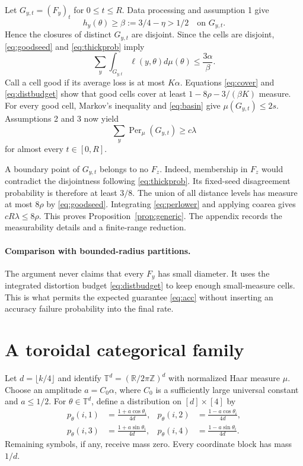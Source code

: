 \documentclass[twoside]{article}
\theoremstyle{definition}
\newcommand{\R}{\mathbb R}
\newcommand{\T}{\mathbb T}
\newcommand{\1}{\mathbf 1}
\newcommand{\Per}{\operatorname{Per}}
\begin{document}
Let $G_{y,t}=(F_y)_t$ for $0\le t\le R$. Data processing and assumption 1 give
\begin{equation}
 h_y(\theta)\ge \beta:=3/4-\eta>1/2
 \quad\text{on }G_{y,t}.
 \label{eq:thickprob}
\end{equation}
Hence the closures of distinct $G_{y,t}$ are disjoint. Since the cells are disjoint, \eqref{eq:goodseed} and \eqref{eq:thickprob} imply
\begin{equation}
 \sum_y\int_{G_{y,t}}\ell(y,\theta)d\mu(\theta)
 \le \frac{3\alpha}{\beta}.
 \label{eq:distbudget}
\end{equation}
Call a cell good if its average loss is at most $K\alpha$. Equations \eqref{eq:cover} and \eqref{eq:distbudget} show that good cells cover at least $1-8\rho-3/(\beta K)$ measure. For every good cell, Markov's inequality and \eqref{eq:basin} give $\mu(G_{y,t})\le2s$. Assumptions 2 and 3 now yield
\begin{equation}
 \sum_y\Per_\mu(G_{y,t})\ge c\lambda
 \label{eq:perlower}
\end{equation}
for almost every $t\in[0,R]$.

A boundary point of $G_{y,t}$ belongs to no $F_z$. Indeed, membership in $F_z$ would contradict the disjointness following \eqref{eq:thickprob}. Its fixed-seed disagreement probability is therefore at least $3/8$. The union of all distance levels has measure at most $8\rho$ by \eqref{eq:goodseed}. Integrating \eqref{eq:perlower} and applying coarea gives $cR\lambda\le8\rho$. This proves Proposition~\ref{prop:generic}. The appendix records the measurability details and a finite-range reduction.

\paragraph{Comparison with bounded-radius partitions.}
The argument never claims that every $F_y$ has small diameter. It uses the integrated distortion budget \eqref{eq:distbudget} to keep enough small-measure cells. This is what permits the expected guarantee \eqref{eq:acc} without inserting an accuracy failure probability into the final rate.

\section{A toroidal categorical family}

Let $d=\lfloor k/4\rfloor$ and identify $\T^d=(\R/2\pi\mathbb Z)^d$ with normalized Haar measure $\mu$. Choose an amplitude $a=C_0\alpha$, where $C_0$ is a sufficiently large universal constant and $a\le1/2$. For $\theta\in\T^d$, define a distribution on $[d]\times[4]$ by
\begin{align}
 p_\theta(i,1)&=\frac{1+a\cos\theta_i}{4d}, &
 p_\theta(i,2)&=\frac{1-a\cos\theta_i}{4d},\nonumber\\
 p_\theta(i,3)&=\frac{1+a\sin\theta_i}{4d}, &
 p_\theta(i,4)&=\frac{1-a\sin\theta_i}{4d}.
 \label{eq:family}
\end{align}
Remaining symbols, if any, receive mass zero. Every coordinate block has mass $1/d$.
\end{document}
